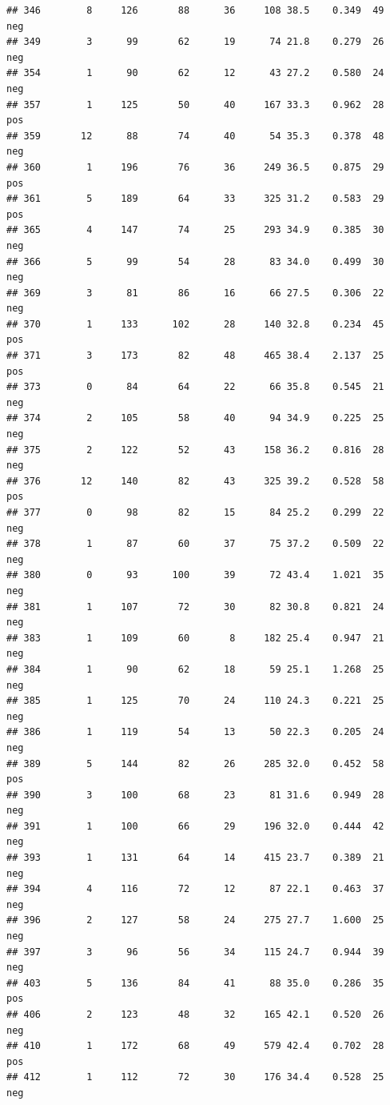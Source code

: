 \documentclass[
]{article}
\begin{document}
\begin{verbatim}
## 346        8     126       88      36     108 38.5    0.349  49      neg
## 349        3      99       62      19      74 21.8    0.279  26      neg
## 354        1      90       62      12      43 27.2    0.580  24      neg
## 357        1     125       50      40     167 33.3    0.962  28      pos
## 359       12      88       74      40      54 35.3    0.378  48      neg
## 360        1     196       76      36     249 36.5    0.875  29      pos
## 361        5     189       64      33     325 31.2    0.583  29      pos
## 365        4     147       74      25     293 34.9    0.385  30      neg
## 366        5      99       54      28      83 34.0    0.499  30      neg
## 369        3      81       86      16      66 27.5    0.306  22      neg
## 370        1     133      102      28     140 32.8    0.234  45      pos
## 371        3     173       82      48     465 38.4    2.137  25      pos
## 373        0      84       64      22      66 35.8    0.545  21      neg
## 374        2     105       58      40      94 34.9    0.225  25      neg
## 375        2     122       52      43     158 36.2    0.816  28      neg
## 376       12     140       82      43     325 39.2    0.528  58      pos
## 377        0      98       82      15      84 25.2    0.299  22      neg
## 378        1      87       60      37      75 37.2    0.509  22      neg
## 380        0      93      100      39      72 43.4    1.021  35      neg
## 381        1     107       72      30      82 30.8    0.821  24      neg
## 383        1     109       60       8     182 25.4    0.947  21      neg
## 384        1      90       62      18      59 25.1    1.268  25      neg
## 385        1     125       70      24     110 24.3    0.221  25      neg
## 386        1     119       54      13      50 22.3    0.205  24      neg
## 389        5     144       82      26     285 32.0    0.452  58      pos
## 390        3     100       68      23      81 31.6    0.949  28      neg
## 391        1     100       66      29     196 32.0    0.444  42      neg
## 393        1     131       64      14     415 23.7    0.389  21      neg
## 394        4     116       72      12      87 22.1    0.463  37      neg
## 396        2     127       58      24     275 27.7    1.600  25      neg
## 397        3      96       56      34     115 24.7    0.944  39      neg
## 403        5     136       84      41      88 35.0    0.286  35      pos
## 406        2     123       48      32     165 42.1    0.520  26      neg
## 410        1     172       68      49     579 42.4    0.702  28      pos
## 412        1     112       72      30     176 34.4    0.528  25      neg

\end{verbatim}
\end{document}
